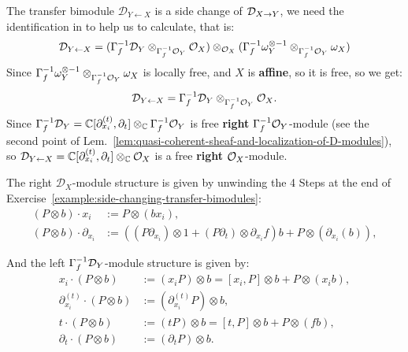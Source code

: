 \begin{example}
\begin{enumerate}
              The transfer bimodule $\mathcal{D}_{Y \leftarrow X}$ is a side change of $\mathcal{D}_{X\rightarrow Y}$,
              we need the identification in \cite[Example~1.3.5]{hotta2008d} to help us to calculate, that is:
              \[
                  \mathcal{D}_{Y\leftarrow X} = (\Gamma_f^{-1}\mathcal{D}_Y \otimes_{\Gamma_f^{-1}\mathcal{O}_Y} \mathcal{O}_X) \otimes_{\mathcal{O}_X} (\Gamma_f^{-1}\omega_Y^{\otimes -1}\otimes_{\Gamma_f^{-1}\mathcal{O}_Y} \omega_X)
              \]
              Since $\Gamma_f^{-1}\omega_Y^{\otimes -1}\otimes_{\Gamma_f^{-1}\mathcal{O}_Y} \omega_X$ is locally free, and $X$ is \textbf{affine}, so it is free, so we get:
              \[
                  \mathcal{D}_{Y\leftarrow X} = \Gamma_f^{-1}\mathcal{D}_Y \otimes_{\Gamma_f^{-1}\mathcal{O}_Y} \mathcal{O}_X.
              \]
              Since $\Gamma_f^{-1}\mathcal{D}_Y = \mathbb{C}[\partial^{(t)}_{x_i}, \partial_t]\otimes_{\mathbb{C}} \Gamma_f^{-1}\mathcal{O}_Y$ is free \textbf{right} $\Gamma_f^{-1}\mathcal{O}_Y$-module (see the second point of Lem.~\ref{lem:quasi-coherent-sheaf-and-localization-of-D-modules}),
              so $\mathcal{D}_{Y\leftarrow X}= \mathbb{C}[\partial^{(t)}_{x_i}, \partial_t]\otimes_{\mathbb{C}} \mathcal{O}_X$ is a free \textbf{right} $\mathcal{O}_X$-module.

              The right $\mathcal{D}_X$-module structure is given by unwinding the 4 Steps at the end of Exercise~\ref{example:side-changing-transfer-bimodules}:
              \begin{align*}
                  (P \otimes b) \cdot x_i            & := P \otimes (b x_i),                                                                                      \\
                  (P \otimes b) \cdot \partial_{x_i} & := ((P \partial_{x_i}) \otimes 1 + (P\partial_t)\otimes \partial_{x_i}f)b + P \otimes (\partial_{x_i}(b)),
              \end{align*}

              And the left $\Gamma_f^{-1}\mathcal{D}_Y$-module structure is given by:
              \begin{align*}
                  x_i \cdot (P \otimes b)                  & := (x_i P) \otimes b             = [x_i, P]\otimes b + P\otimes (x_i b), \\
                  \partial^{(t)}_{x_i} \cdot (P \otimes b) & := (\partial^{(t)}_{x_i} P) \otimes b,                                   \\
                  t \cdot (P \otimes b)                    & := (t P) \otimes b               = [t, P]\otimes b + P\otimes (f b),     \\
                  \partial_t \cdot (P \otimes b)           & := (\partial_t P) \otimes b.
              \end{align*}


\end{enumerate}
\end{example}
